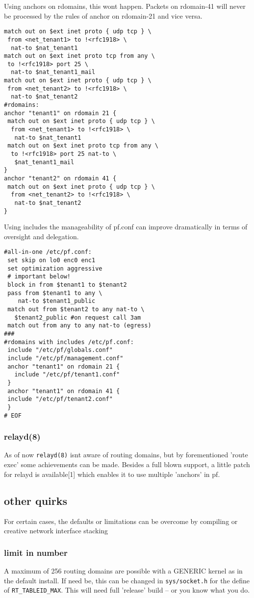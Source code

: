 \documentclass[letterpaper,twocolumn,10pt]{article}
\begin{document}
Using anchors on rdomains, this wont happen. Packets on rdomain-41 will never be processed by the rules of anchor on
rdomain-21 and vice versa. 
\begin{verbatim}
match out on $ext inet proto { udp tcp } \
 from <net_tenant1> to !<rfc1918> \
  nat-to $nat_tenant1
match out on $ext inet proto tcp from any \
 to !<rfc1918> port 25 \
  nat-to $nat_tenant1_mail
match out on $ext inet proto { udp tcp } \
 from <net_tenant2> to !<rfc1918> \
  nat-to $nat_tenant2
#rdomains:
anchor "tenant1" on rdomain 21 {
 match out on $ext inet proto { udp tcp } \
  from <net_tenant1> to !<rfc1918> \
   nat-to $nat_tenant1
 match out on $ext inet proto tcp from any \
  to !<rfc1918> port 25 nat-to \
   $nat_tenant1_mail
}
anchor "tenant2" on rdomain 41 {
 match out on $ext inet proto { udp tcp } \
  from <net_tenant2> to !<rfc1918> \
   nat-to $nat_tenant2
}
\end{verbatim}

Using includes the manageability of pf.conf can improve dramatically in terms of oversight and delegation. 
\begin{verbatim}
#all-in-one /etc/pf.conf:
 set skip on lo0 enc0 enc1
 set optimization aggressive
 # important below!
 block in from $tenant1 to $tenant2
 pass from $tenant1 to any \
    nat-to $tenant1_public
 match out from $tenant2 to any nat-to \
   $tenant2_public #on request call 3am
 match out from any to any nat-to (egress)
###
#rdomains with includes /etc/pf.conf:
 include "/etc/pf/globals.conf"
 include "/etc/pf/management.conf"
 anchor "tenant1" on rdomain 21 {
   include "/etc/pf/tenant1.conf"
 }
 anchor "tenant1" on rdomain 41 {
 include "/etc/pf/tenant2.conf"
 }
# EOF
\end{verbatim}
\subsubsection{relayd(8)}
As of now {\tt relayd(8)} isnt aware of routing domains, but by forementioned 'route exec' some achievements can be made.
Besides a full blown support, a little patch for relayd is available[1] which enables it to use multiple 'anchors' in pf.

\subsection{other quirks}
For certain cases, the defaults or limitations can be overcome by compiling or creative network interface stacking
\subsubsection{limit in number}
A maximum of 256 routing domains are possible with a GENERIC kernel as in the default install.
If need be, this can be changed in {\tt sys/socket.h} for the define of {\tt RT\_TABLEID\_MAX}. This will need full 'release' build -- or you know what you do.
\end{document}
